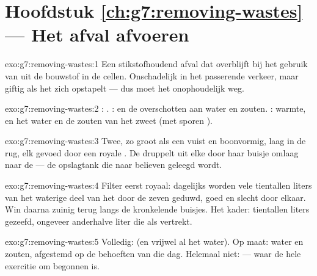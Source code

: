 \section*{Hoofdstuk \ref{ch:g7:removing-wastes} --- Het afval afvoeren}

\begin{solution}{exo:g7:removing-wastes:1}
Een stikstofhoudend afval dat overblijft bij het gebruik van
 uit de bouwstof in de cellen. Onschadelijk in het
passerende verkeer, maar giftig als het zich opstapelt --- dus moet het
onophoudelijk weg.
\end{solution}

\begin{solution}{exo:g7:removing-wastes:2}
: . :  en de overschotten aan water en
zouten. : warmte, en het water en de zouten van het zweet (met sporen
).
\end{solution}

\begin{solution}{exo:g7:removing-wastes:3}
Twee, zo groot als een vuist en boonvormig, laag in de rug, elk gevoed
door een royale . De  druppelt uit elke  door haar buisje
omlaag naar de  --- de opslagtank die naar believen geleegd wordt.
\end{solution}

\begin{solution}{exo:g7:removing-wastes:4}
Filter eerst royaal: dagelijks worden vele tientallen liters van het
waterige deel van het  door de zeven geduwd, goed en slecht door
elkaar. Win daarna zuinig terug langs de kronkelende buisjes. Het kader:
tientallen liters gezeefd, ongeveer anderhalve liter die als 
vertrekt.
\end{solution}

\begin{solution}{exo:g7:removing-wastes:5}
Volledig:  (en vrijwel al het water). Op maat: water en zouten,
afgestemd op de behoeften van die dag. Helemaal niet:  --- waar de
hele exercitie om begonnen is.
\end{solution}

